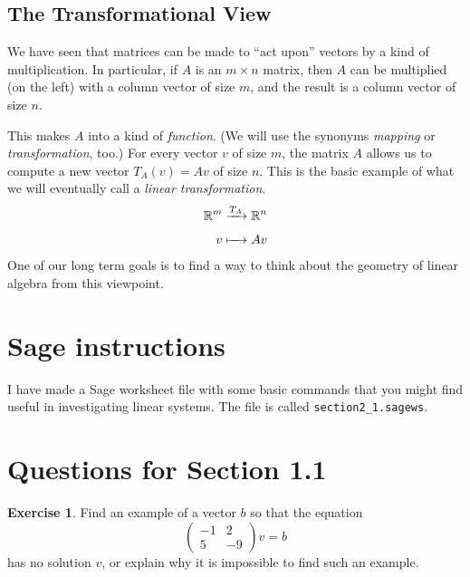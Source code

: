 \documentclass[11pt]{amsart}
\theoremstyle{definition}
\newtheorem{exercise}{Exercise}
\begin{document}
\subsection{The Transformational View}

We have seen that matrices can be made to ``act upon'' vectors by a kind of multiplication. In particular, if $A$ is an $m \times n$ matrix, then $A$ can be multiplied (on the left) with a column vector of size $m$, and the result is a column vector of size $n$.

This makes $A$ into a kind of \emph{function}. (We will use the synonyms \emph{mapping} or \emph{transformation}, too.)
For every vector $v$ of size $m$, the matrix $A$ allows us to compute a new vector $T_A(v) = Av$ of size $n$. This is the basic example of what we will eventually call a \emph{linear transformation}.
\begin{align*}
\mathbb{R}^m & \xrightarrow[]{T_A} \mathbb{R}^n \\
v & \xmapsto[]{\phantom{T_A}} Av
\end{align*}
One of our long term goals is to find a way to think about the geometry of linear algebra from this viewpoint.



\section{Sage instructions}

I have made a Sage worksheet file with some basic commands that you might find useful in investigating linear systems. The file is called \texttt{section2\_1.sagews}.


\section{Questions for Section 1.1}

\begin{exercise}
Find an example of a vector $b$ so that the equation
\[
\begin{pmatrix} -1 & 2 \\ 5 & -9\end{pmatrix} v = b
\]
has no solution $v$, or explain why it is impossible to find such an example.
\end{exercise}
\end{document}
